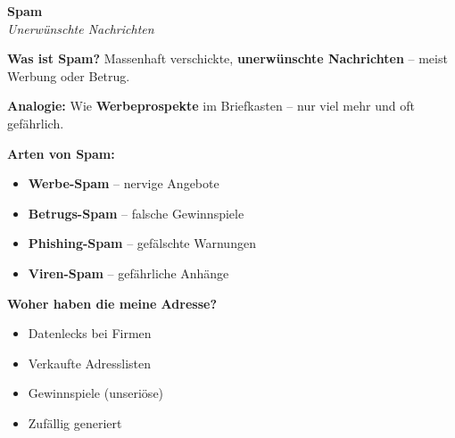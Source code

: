 \documentclass[a4paper,landscape,8pt]{extarticle}
\begin{document}
\begin{minipage}[t]{0.32\linewidth}
\vspace{2mm}

\begin{center}
\end{center}

\end{minipage}%
\hfill%
\begin{minipage}[t]{0.32\linewidth}
\begin{center}
\colorbox{spamorange!10}{%
\begin{minipage}{0.95\linewidth}
\vspace{2mm}
\begin{center}
{\Large\bfseries\textcolor{spamorange}{Spam}}\\[1pt]
{\footnotesize\itshape Unerwünschte Nachrichten}
\end{center}
\vspace{2mm}
\end{minipage}%
}
\end{center}

\vspace{1mm}

\textbf{Was ist Spam?} Massenhaft verschickte, \textbf{unerwünschte Nachrichten} -- meist Werbung oder Betrug.

\textbf{Analogie:} Wie \textbf{Werbeprospekte} im Briefkasten -- nur viel mehr und oft gefährlich.

\textbf{Arten von Spam:}
\begin{itemize}
\item \textbf{Werbe-Spam} -- nervige Angebote
\item \textbf{Betrugs-Spam} -- falsche Gewinnspiele
\item \textbf{Phishing-Spam} -- gefälschte Warnungen
\item \textbf{Viren-Spam} -- gefährliche Anhänge
\end{itemize}

\textbf{Woher haben die meine Adresse?}
\begin{itemize}
\item Datenlecks bei Firmen
\item Verkaufte Adresslisten
\item Gewinnspiele (unseriöse)
\item Zufällig generiert
\end{itemize}


\end{minipage}
\end{document}

